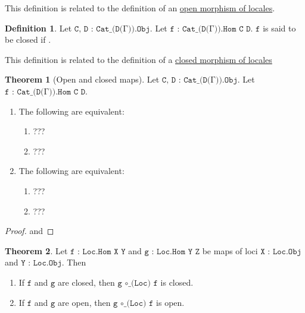 \documentclass{book}
\theoremstyle{definition}
\newtheorem{definition}{Definition}
\newtheorem{theorem}{Theorem}
\begin{document}
{{This definition is related to the definition of an \href{https://ncatlab.org/nlab/show/open+morphism}{open morphism of locales}.

\begin{definition}
Let $\texttt{C, D : Cat\_(D(Γ)).Obj}$. Let $\texttt{f : Cat\_(D(Γ)).Hom C D}$. $\texttt{f}$ is said to be closed if .
\end{definition}

This definition is related to the definition of a \href{https://ncatlab.org/nlab/show/closed+morphism}{closed morphism of locales}

\begin{theorem}[Open and closed maps]
Let $\texttt{C, D : Cat\_(D(Γ)).Obj}$. Let $\texttt{f : Cat\_(D(Γ)).Hom C D}$.
\begin{enumerate}
\item The following are equivalent: 
\begin{enumerate}
\item ??? 
\item ???
\end{enumerate}
\item The following are equivalent:
\begin{enumerate}
\item ??? 
\item ???
\end{enumerate}
\end{enumerate}
\end{theorem}

\begin{proof}

and

\end{proof}

\begin{theorem}
Let $\texttt{f : Loc.Hom X Y}$ and $\texttt{g : Loc.Hom Y Z}$ be maps of loci $\texttt{X : Loc.Obj}$ and $\texttt{Y : Loc.Obj}$. Then
\begin{enumerate}
\item If $\texttt{f}$ and $\texttt{g}$ are closed, then $\texttt{g ∘\_(Loc) f}$ is closed.
\item If $\texttt{f}$ and $\texttt{g}$ are open, then $\texttt{g ∘\_(Loc) f}$ is open.
\end{enumerate} 
\end{theorem}


}}
\end{document}
